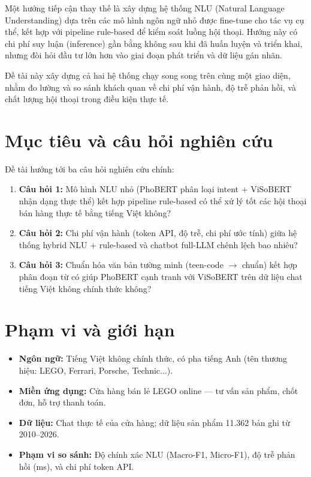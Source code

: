 \documentclass[12pt, a4paper]{report}
\begin{document}
Một hướng tiếp cận thay thế là xây dựng hệ thống NLU (Natural Language Understanding)
dựa trên các mô hình ngôn ngữ nhỏ được fine-tune cho tác vụ cụ thể, kết hợp với
pipeline rule-based để kiểm soát luồng hội thoại. Hướng này có chi phí suy luận
(inference) gần bằng không sau khi đã huấn luyện và triển khai, nhưng đòi hỏi
đầu tư lớn hơn vào giai đoạn phát triển và dữ liệu gán nhãn.

Đề tài này xây dựng cả hai hệ thống chạy song song trên cùng một giao diện,
nhằm đo lường và so sánh khách quan về chi phí vận hành, độ trễ phản hồi,
và chất lượng hội thoại trong điều kiện thực tế.

\section{Mục tiêu và câu hỏi nghiên cứu}

Đề tài hướng tới ba câu hỏi nghiên cứu chính:

\begin{enumerate}
  \item \textbf{Câu hỏi 1:} Mô hình NLU nhỏ (PhoBERT phân loại intent + ViSoBERT
        nhận dạng thực thể) kết hợp pipeline rule-based có thể xử lý tốt các
        hội thoại bán hàng thực tế bằng tiếng Việt không?
  \item \textbf{Câu hỏi 2:} Chi phí vận hành (token API, độ trễ, chi phí ước tính)
        giữa hệ thống hybrid NLU + rule-based và chatbot full-LLM chênh lệch bao nhiêu?
  \item \textbf{Câu hỏi 3:} Chuẩn hóa văn bản tường minh (teen-code $\rightarrow$
        chuẩn) kết hợp phân đoạn từ có giúp PhoBERT cạnh tranh với ViSoBERT
        trên dữ liệu chat tiếng Việt không chính thức không?
\end{enumerate}

\section{Phạm vi và giới hạn}

\begin{itemize}
  \item \textbf{Ngôn ngữ:} Tiếng Việt không chính thức, có pha tiếng Anh
        (tên thương hiệu: LEGO, Ferrari, Porsche, Technic...).
  \item \textbf{Miền ứng dụng:} Cửa hàng bán lẻ LEGO online — tư vấn sản phẩm,
        chốt đơn, hỗ trợ thanh toán.
  \item \textbf{Dữ liệu:} Chat thực tế của cửa hàng; dữ liệu sản phẩm
        11.362 bản ghi từ 2010--2026.
  \item \textbf{Phạm vi so sánh:} Độ chính xác NLU (Macro-F1, Micro-F1),
        độ trễ phản hồi (ms), và chi phí token API.
\end{itemize}
\end{document}

